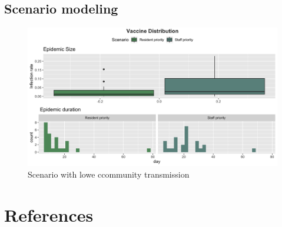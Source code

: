 \documentclass[
]{article}
\begin{document}
\hypertarget{scenario-modeling-1}{%
\subsection{Scenario modeling}\label{scenario-modeling-1}}

\begin{figure}
\caption{Scenario with lowe ccommunity transmission}
\centering
\includegraphics{Figures/Scenarios/VaccineDist}
\end{figure}

\hypertarget{references}{%
\section*{References}\label{references}}
\end{document}
